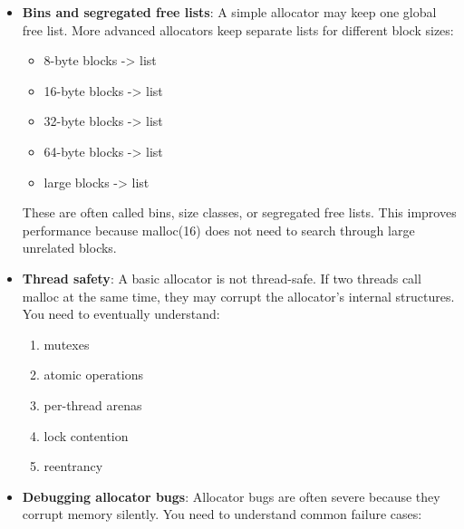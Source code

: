 \documentclass{report}
\begin{document}
\begin{itemize}
\begin{verbatim}
                    | header | user memory | footer |
                    +--------+-------------+--------+
                \end{verbatim}
                This makes it easier to find neighboring blocks and coalesce them efficiently.
                \bigbreak \noindent 
                Without boundary tags, coalescing can require scanning the whole list.
            \item \textbf{Bins and segregated free lists}: A simple allocator may keep one global free list.
                \bigbreak \noindent 
                More advanced allocators keep separate lists for different block sizes:
                \begin{itemize}
                    \item 8-byte blocks    -> list
                    \item 16-byte blocks   -> list
                    \item 32-byte blocks   -> list
                    \item 64-byte blocks   -> list
                    \item large blocks     -> list
                \end{itemize}
                These are often called bins, size classes, or segregated free lists. This improves performance because malloc(16) does not need to search through large unrelated blocks.
            \item \textbf{Thread safety}: A basic allocator is not thread-safe. If two threads call malloc at the same time, they may corrupt the allocator’s internal structures. 
                \bigbreak \noindent 
                You need to eventually understand:
                \begin{enumerate}
                    \item mutexes
                    \item atomic operations
                    \item per-thread arenas
                    \item lock contention
                    \item reentrancy
                \end{enumerate}
            \item \textbf{Debugging allocator bugs}: Allocator bugs are often severe because they corrupt memory silently.
                \bigbreak \noindent 
                You need to understand common failure cases:
                \begin{enumerate}

\end{enumerate}
\end{itemize}
\end{document}
